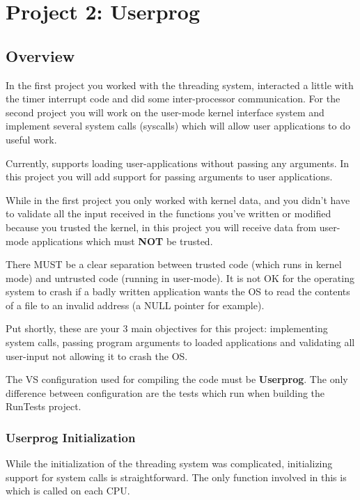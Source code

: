 \chapter{Project 2: Userprog}

\section{Overview}

In the first project you worked with the threading system, interacted a little with the timer
interrupt code and did some inter-processor communication. For the second project you will work on
the user-mode kernel interface system and implement several system calls (syscalls) which will
allow user applications to do useful work.

Currently, \projectname supports loading user-applications without passing any arguments. In this
project you will add support for passing arguments to user applications.

While in the first project you only worked with kernel data, and you didn't have to validate all the
input received in the functions you've written or modified because you trusted the kernel, in this
project you will receive data from user-mode applications which must \textbf{NOT} be trusted.

There MUST be a clear separation between trusted code (which runs in kernel mode) and untrusted code
(running in user-mode). It is not OK for the operating system to crash if a badly written
application wants the OS to read the contents of a file to an invalid address (a NULL pointer for
example).

Put shortly, these are your 3 main objectives for this project: implementing system calls, passing
program arguments to loaded applications and validating all user-input not allowing it to crash the
OS.

The VS configuration used for compiling the code must be \textbf{Userprog}. The only difference
between configuration are the tests which run when building the RunTests project.

\subsection{Userprog Initialization}

While the initialization of the threading system was complicated, initializing support for system
calls is straightforward. The only function involved in this is  which is
called on each CPU.

